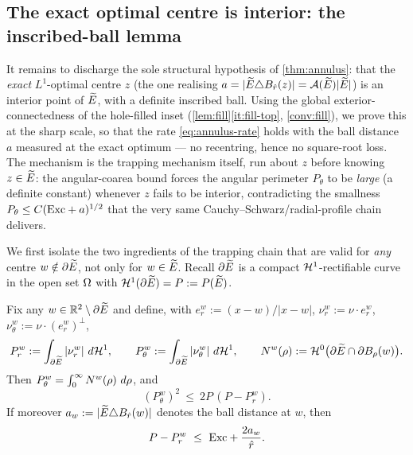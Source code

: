 \subsection{The exact optimal centre is interior: the inscribed-ball lemma}
\label{ss:zinterior}

It remains to discharge the sole structural hypothesis of \cref{thm:annulus}:
that the \emph{exact} $L^1$-optimal centre $z$ (the one realising
$a=|\widetilde{E}\triangle B_{\hat r}(z)|=\mathcal{A}(\widetilde{E})|\widetilde{E}|$) is an interior point of
$\widetilde{E}$, with a definite inscribed ball. Using the global
exterior-connectedness of the hole-filled inset (\cref{lem:fill}\ref{it:fill-top},
\cref{conv:fill}), we prove this
at the sharp scale, so that the rate \eqref{eq:annulus-rate} holds with the
ball distance $a$ measured at the exact optimum --- no recentring, hence no
square-root loss. The mechanism is the trapping mechanism itself, run
about $z$ before knowing $z\in\widetilde{E}$: the angular-coarea bound forces the
angular perimeter $P_\theta$ to be \emph{large} (a definite constant) whenever
$z$ fails to be interior, contradicting the smallness $P_\theta\le
C(\mathrm{Exc}+a)^{1/2}$ that the very same Cauchy--Schwarz/radial-profile chain
delivers.

We first isolate the two ingredients of the trapping chain that are valid for
\emph{any} centre $w\notin\partial\widetilde{E}$, not only for $w\in\widetilde{E}$. Recall
$\partial\widetilde{E}$ is a compact $\mathcal{H}^1$-rectifiable curve in the open set $\Omega$
with $\mathcal{H}^1(\partial\widetilde{E})=P:=P(\widetilde{E})$.

\begin{lemma}
\label{lem:centrefree}
Fix any $w\in\mathbb{R}^2\setminus\partial\widetilde{E}$ and define, with $e_r^w:=(x-w)/|x-w|$,
$\nu_r^w:=\nu\cdot e_r^w$, $\nu_\theta^w:=\nu\cdot(e_r^w)^\perp$,
\[
   P_r^w:=\int_{\partial\widetilde{E}}|\nu_r^w|\,\,d\mathcal{H}^1,
   \qquad
   P_\theta^w:=\int_{\partial\widetilde{E}}|\nu_\theta^w|\,\,d\mathcal{H}^1,
   \qquad
   N^w(\rho):=\mathcal{H}^0\bigl(\partial\widetilde{E}\cap\partial B_\rho(w)\bigr).
\]
Then $P_\theta^w=\int_0^\infty N^w(\rho)\,\,d\rho$, and
\begin{equation}\label{eq:cf-cs}
   (P_\theta^w)^2\ \le\ 2P\,(P-P_r^w).
\end{equation}
If moreover $a_w:=|\widetilde{E}\triangle B_{\hat r}(w)|$ denotes the ball distance at
$w$, then
\begin{equation}\label{eq:cf-radial}
   P-P_r^w\ \le\ \mathrm{Exc}+\frac{2a_w}{\hat r}.
\end{equation}
\end{lemma}

